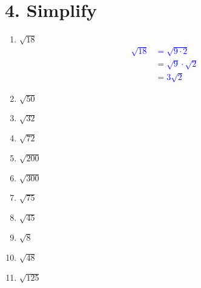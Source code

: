 \documentclass{hw}
\begin{document}
\section*{\normalsize 4. Simplify}
\begin{enumerate}[label=\alph*.]
    \item $\sqrt{18}$
        \textcolor{blue}{
        \begin{align*}
        \sqrt{18} &= \sqrt{9 \cdot 2} \\
                    &= \sqrt{9} \cdot \sqrt{2} \\
                    &= 3 \sqrt{2}
        \end{align*}
        }
    \item $\sqrt{50}$
        \studentxlargeworkspace
    \item $\sqrt{32}$
        \studentxlargeworkspace
    \item $\sqrt{72}$
        \studentxlargeworkspace
    \item $\sqrt{200}$
        \studentworkspace
    \item $\sqrt{300}$
        \studentworkspace
    \item $\sqrt{75}$
        \studentworkspace
    \item $\sqrt{45}$
        \studentworkspace
    \item $\sqrt{8}$
        \studentworkspace
    \item $\sqrt{48}$
        \studentworkspace
    \item $\sqrt{125}$
        \studentworkspace
\end{enumerate}
\end{document}
